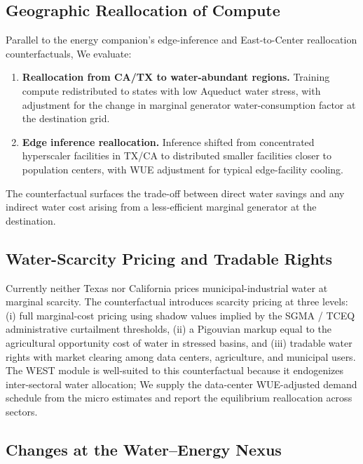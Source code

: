 \documentclass[11pt, letterpaper]{article}
\begin{document}
\subsection{Geographic Reallocation of Compute}
\label{sec:cf_geo}

Parallel to the energy companion's edge-inference and East-to-Center reallocation counterfactuals, We evaluate:
\begin{enumerate}[label=(\roman*)]
\item \textbf{Reallocation from CA/TX to water-abundant regions.} Training compute redistributed to states with low Aqueduct water stress, with adjustment for the change in marginal generator water-consumption factor at the destination grid.
\item \textbf{Edge inference reallocation.} Inference shifted from concentrated hyperscaler facilities in TX/CA to distributed smaller facilities closer to population centers, with WUE adjustment for typical edge-facility cooling.
\end{enumerate}
The counterfactual surfaces the trade-off between direct water savings and any indirect water cost arising from a less-efficient marginal generator at the destination.

\subsection{Water-Scarcity Pricing and Tradable Rights}
\label{sec:cf_pricing}

Currently neither Texas nor California prices municipal-industrial water at marginal scarcity. The counterfactual introduces scarcity pricing at three levels: (i) full marginal-cost pricing using shadow values implied by the SGMA / TCEQ administrative curtailment thresholds, (ii) a Pigouvian markup equal to the agricultural opportunity cost of water in stressed basins, and (iii) tradable water rights with market clearing among data centers, agriculture, and municipal users. The WEST module is well-suited to this counterfactual because it endogenizes inter-sectoral water allocation; We supply the data-center WUE-adjusted demand schedule from the micro estimates and report the equilibrium reallocation across sectors.

\subsection{Changes at the Water--Energy Nexus}
\label{sec:cf_nexus}
\end{document}
